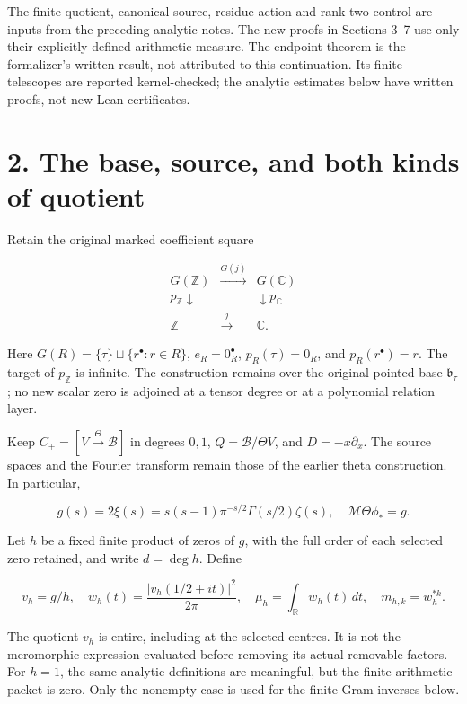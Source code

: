 The finite quotient, canonical source, residue action and rank-two
control are inputs from the preceding analytic notes. The new proofs in
Sections 3--7 use only their explicitly defined arithmetic measure. The
endpoint theorem is the formalizer's written result, not attributed to
this continuation. Its finite telescopes are reported kernel-checked;
the analytic estimates below have written proofs, not new Lean
certificates.

\section{2. The base, source, and both kinds of
quotient}\label{GraphV2:the-base-source-and-both-kinds-of-quotient}

Retain the original marked coefficient square

\[
\begin{array}{ccc}
 G(\mathbb Z)&\xrightarrow{G(j)}&G(\mathbb{C})\\
 p_{\mathbb Z}\downarrow&&\downarrow p_{\mathbb{C}}\\
 \mathbb Z&\xrightarrow{j}&\mathbb{C}.
\end{array}                                                          \tag{5}
\]

Here \(G(R)=\{\tau\}\sqcup\{r^\bullet:r\in R\}\), \(e_R=0_R^\bullet\),
\(p_R(\tau)=0_R\), and \(p_R(r^\bullet)=r\). The target of
\(p_{\mathbb Z}\) is infinite. The construction remains over the
original pointed base \(\mathfrak b_\tau\); no new scalar zero is
adjoined at a tensor degree or at a polynomial relation layer.

Keep \(C_+=[V\xrightarrow{\Theta}\mathscr B]\) in degrees \(0,1\),
\(Q=\mathscr B/\Theta V\), and \(D=-x\partial_x\). The source spaces and
the Fourier transform remain those of the earlier theta construction. In
particular,

\[
 g(s)=2\xi(s)=s(s-1)\pi^{-s/2}\Gamma(s/2)\zeta(s),\quad
 \mathcal M\Theta\phi_*=g.                                            \tag{6}
\]

Let \(h\) be a fixed finite product of zeros of \(g\), with the full
order of each selected zero retained, and write \(d=\deg h\). Define

\[
 v_h=g/h,\quad
 w_h(t)=\frac{|v_h(1/2+it)|^2}{2\pi},\quad
 \mu_h=\int_{\mathbb{R}}w_h(t)\,dt,\quad m_{h,k}=w_h^{*k}.               \tag{7}
\]

The quotient \(v_h\) is entire, including at the selected centres. It is
not the meromorphic expression evaluated before removing its actual
removable factors. For \(h=1\), the same analytic definitions are
meaningful, but the finite arithmetic packet is zero. Only the nonempty
case is used for the finite Gram inverses below.

